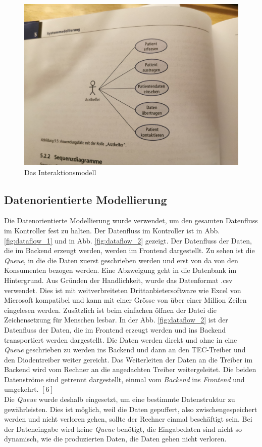\begin{figure}[H]
    \centering
    \includegraphics[scale=0.09]{98_images/interaktionsmodell.jpg}
    \caption{Das Interaktionsmodell}
    \label{fig:interaktionsmodell}
\end{figure}

\subsection{Datenorientierte Modellierung}
Die Datenorientierte Modellierung wurde verwendet, um den gesamten Datenfluss im Kontroller fest zu halten. Der Datenfluss im Kontroller ist in Abb. \ref{fig:dataflow_1} und in Abb. \ref{fig:dataflow_2} gezeigt. Der Datenfluss der Daten, die im Backend erzeugt werden, werden im Frontend dargestellt. Zu sehen ist die \textit{Queue}, in die die Daten zuerst geschrieben werden und erst von da von den Konsumenten bezogen werden. Eine Abzweigung geht in die Datenbank im Hintergrund. Aus Gründen der Handlichkeit, wurde das Datenformat .csv verwendet. Dies ist mit weitverbreiteten Drittanbietersoftware wie Excel von Microsoft kompatibel und kann mit einer Grösse von über einer Million Zeilen eingelesen werden. Zusätzlich ist beim einfachen öffnen der Datei die Zeichensetzung für Menschen lesbar. In der Abb. \ref{fig:dataflow_2} ist der Datenfluss der Daten, die im Frontend erzeugt werden und ins Backend transportiert werden dargestellt. Die Daten werden direkt und ohne in eine \textit{Queue} geschrieben zu werden ins Backend und dann an den TEC-Treiber und den Diodentreiber weiter gereicht. Das Weiterleiten der Daten an die Treiber im Backend wird vom Rechner an die angedachten Treiber weitergeleitet. Die beiden Datenströme sind getrennt dargestellt, einmal vom \textit{Backend} ins \textit{Frontend} und umgekehrt. $[6]$\\  %
Die \textit{Queue} wurde deshalb eingesetzt, um eine bestimmte Datenstruktur zu gewährleisten. Dies ist möglich, weil die Daten gepuffert, also zwischengespeichert werden und nicht verloren gehen, sollte der Rechner einmal beschäftigt sein. Bei der Dateneingabe wird keine \textit{Queue} benötigt, die Eingabedaten sind nicht so dynamisch, wie die produzierten Daten, die Daten gehen nicht verloren.

